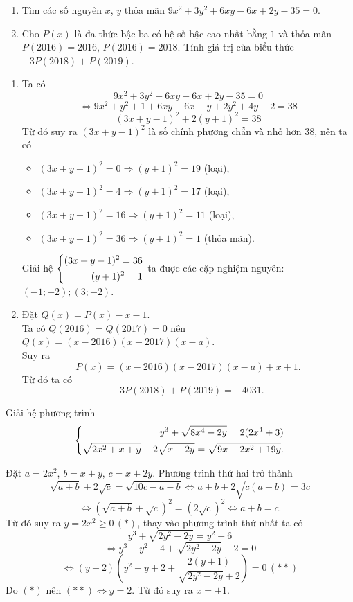 \begin{ex}%
\hfill
    \begin{enumerate}    
        \item Tìm các số nguyên $x$, $y$ thỏa mãn $9x^2+3y^2+6xy-6x+2y-35=0$.
        \item Cho $P(x)$ là đa thức bậc ba có hệ số bậc cao nhất bằng $1$ và thỏa mãn $P(2016)=2016$, $P(2016)=2018$. Tính giá trị của biểu thức $-3P(2018)+P(2019)$.
    \end{enumerate}
\loigiai
    {
    \begin{enumerate}
        \item Ta có 
        $$9x^2+3y^2+6xy-6x+2y-35=0$$
        $$\Leftrightarrow 9x^2+y^2+1+6xy-6x-y+2y^2+4y+2=38$$
        $$(3x+y-1)^2+2(y+1)^2=38$$
        Từ đó suy ra $(3x+y-1)^2$ là số chính phương chẵn và nhỏ hơn $38$, nên ta có
        \begin{itemize}
        \item $(3x+y-1)^2=0\Rightarrow (y+1)^2=19$ (loại),
        \item $(3x+y-1)^2=4\Rightarrow (y+1)^2=17$ (loại),
        \item $(3x+y-1)^2=16\Rightarrow (y+1)^2=11$ (loại),
        \item $(3x+y-1)^2=36\Rightarrow (y+1)^2=1$ (thỏa mãn).
        \end{itemize} 
        Giải hệ $\left\{\begin{aligned}(3x+y-1)^2=36\\ (y+1)^2=1\end{aligned}\right.$ ta được các cặp nghiệm nguyên: $(-1;-2); (3;-2)$.
        \item Đặt $Q(x)=P(x)-x-1$.\\ 
        Ta có $Q(2016)=Q(2017)=0$ nên $Q(x)=(x-2016)(x-2017)(x-a)$.\\
        Suy ra
        $$P(x)=(x-2016)(x-2017)(x-a)+x+1.$$
        Từ đó ta có
        $$-3P(2018)+P(2019)=-4031.$$
       
    \end{enumerate}
    }
\end{ex}

\begin{ex}%
    Giải hệ phương trình $$\left\{\begin{aligned}y^3+\sqrt{8x^4-2y}=2(2x^4+3)\\ \sqrt{2x^2+x+y}+2\sqrt{x+2y}=\sqrt{9x-2x^2+19y}.\end{aligned}\right.$$
    
\loigiai
    {
Đặt $a=2x^2$, $b=x+y$, $c=x+2y$. Phương trình thứ hai trở thành
$$\sqrt{a+b}+2\sqrt{c}=\sqrt{10c-a-b}\Leftrightarrow a+b+2\sqrt{c(a+b)}=3c$$
$$\Leftrightarrow \left(\sqrt{a+b}+\sqrt{c}\right)^2=\left(2\sqrt{c}\right)^2\Leftrightarrow a+b=c.$$
	Từ đó suy ra $y=2x^2\ge 0\, (*)$, thay vào phương trình thứ nhất ta có
	$$y^3+\sqrt{2y^2-2y}=y^2+6$$
	$$\Leftrightarrow y^3-y^2-4+\sqrt{2y^2-2y}-2=0$$
	$$\Leftrightarrow (y-2)\left(y^2+y+2+\dfrac{2(y+1)}{\sqrt{2y^2-2y}+2}\right)=0\, (**)$$
	Do $(*)$ nên $(**)\Leftrightarrow y=2$.
	Từ đó suy ra $x=\pm 1$.
    }
\end{ex}

